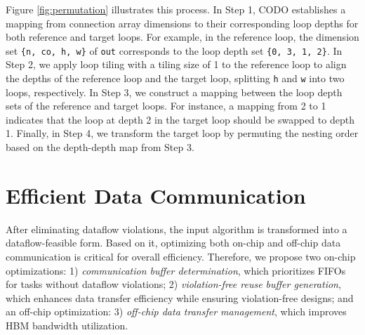 \documentclass[conference]{IEEEtran}
\begin{document}
Figure \ref{fig:permutation} illustrates this process. In Step 1, CODO establishes a mapping from connection array dimensions to their corresponding loop depths for both reference and target loops. 
For example, in the reference loop, the dimension set \texttt{\{n, co, h, w\}} of \texttt{out} corresponds to the loop depth set \texttt{\{0, 3, 1, 2\}}. In Step 2, we apply loop tiling with a tiling size of 1 to the reference loop to align the depths of the reference loop and the target loop, splitting \texttt{h} and \texttt{w} into two loops, respectively. In Step 3, we construct a mapping between the loop depth sets of the reference and target loops. For instance, a mapping from 2 to 1 indicates that the loop at depth 2 in the target loop should be swapped to depth 1. Finally, in Step 4, we transform the target loop by permuting the nesting order based on the depth-depth map from Step 3. 

\section{Efficient Data Communication} \label{sec:mem}
After eliminating dataflow violations, the input algorithm is transformed into a dataflow-feasible form. 
Based on it, optimizing both on-chip and off-chip data communication is critical for overall efficiency. Therefore, we propose two on-chip optimizations: 1) \textit{communication buffer determination}, which prioritizes FIFOs for tasks without dataflow violations;
2) \textit{violation-free reuse buffer generation}, which enhances data transfer efficiency while ensuring violation-free designs; and an off-chip optimization: 3) \textit{off-chip data transfer management}, which improves HBM bandwidth utilization.

\end{document}
